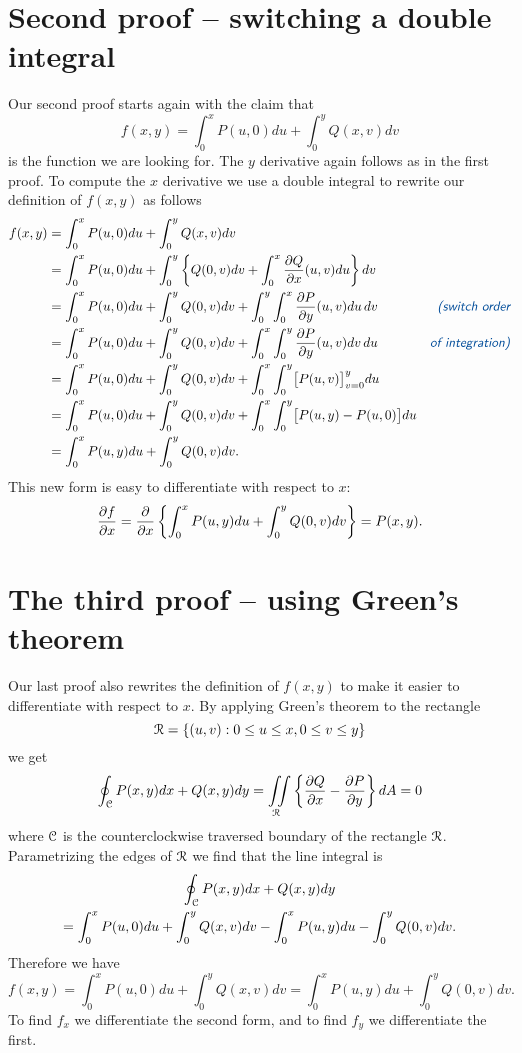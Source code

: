 \documentclass{amsbook}
\begin{document}
\section{Second proof -- switching a double integral}
Our second proof starts again with the claim that 
\[
 f(x,y) = \int_0^x P(u, 0) du + \int_0^y Q(x, v) dv 
\]
is the function we are looking for.  The $y$ derivative again follows as in the first proof. To compute the $x$ derivative we use a double integral to rewrite our definition of $f(x,y)$ as follows
\begin{align*}
f(x, y) &=\int_0^x P(u, 0) du + \int_0^y Q(x, v) dv \\
&= \int_0^x P(u,0)du + \int_0^y \left\{Q(0, v) dv + \int_0^x \pdd Qx(u,v) du\right\} dv \\
&= \int_0^x P(u,0)du + \int_0^y Q(0, v) dv + \int_0^y\int_0^x \pdd Py(u,v) du\, dv  &\text{\dfnt(switch order}\\
&= \int_0^x P(u,0)du + \int_0^y Q(0, v) dv + \int_0^x\int_0^y \pdd Py(u,v) dv\, du  &\text{\dfnt of integration)}\\
&= \int_0^x P(u,0)du + \int_0^y Q(0, v) dv + \int_0^x\int_0^y \bigl[ P(u,v)\bigr]_{v=0}^y du\\
&= \int_0^x P(u,0)du + \int_0^y Q(0, v) dv + \int_0^x\int_0^y  \bigl[P(u,y)-P(u,0)\bigr] du \\
&= \int_0^x P(u,y)du + \int_0^y Q(0, v) dv . 
\end{align*}
This new form is easy to differentiate with respect to $x$:
\[
 \frac{\partial f}{\partial x} = 
 \frac{\partial }{\partial x}\left\{ \int_0^x P(u,y)du + \int_0^y Q(0, v) dv
 \right\} 
 =P(x,y).
\]

\section{The third proof -- using Green's theorem}
Our last proof also rewrites the definition of $f(x,y)$ to make it easier to differentiate with respect to $x$.  By applying Green's theorem to the rectangle 
\[
\mathcal{R} = \{ (u,v) : 0\leq u\leq x, 0\leq v\leq y\}
\]
we get 
\[
\oint_{\mathcal{C}} P(x, y)dx+Q(x, y)dy
=\iint\limits_{\mathcal{R}} \left\{\frac{\partial Q}{\partial x}-\frac{\partial P}{\partial y}\right\} dA
=0
\]
where $\mathcal{C}$ is the counterclockwise traversed boundary of the rectangle $\mathcal{R}$.  Parametrizing the edges of $\mathcal{R}$ we find that the line integral is
\begin{multline*}
\oint_{\mathcal{C}} P(x, y)dx+Q(x, y)dy\\
=\int_0^x P(u,0)du + \int_0^y Q(x, v)dv - \int_0^x P(u, y) du - \int_0^y Q(0, v)dv.
\end{multline*}
Therefore we have
\[
  f(x,y) 
  = \int_0^x P(u,0)du + \int_0^y Q(x, v)dv = \int_0^x P(u, y) du + \int_0^y Q(0, v)dv.
\]
To find $f_x$ we differentiate the second form, and to find $f_y$ we differentiate the first.
\end{document}
